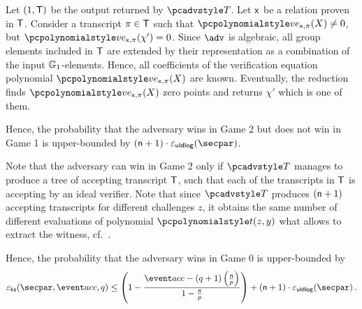   Let $(1, \mathsf{T})$ be the output returned by $\tdv$. Let $\mathsf{x}$ be a relation proven in $\mathsf{T}$.  Consider a transcript $\pi \in \mathsf{T}$ such that $\vereq_{\inp, \zkproof}(X) \neq 0$, but $\vereq_{\inp, \zkproof}(\chi') = 0$. Since $\adv$ is algebraic, all group elements included in $\mathsf{T}$ are extended by their representation as a combination of the input $\mathbb{G}_1$-elements. Hence, all coefficients of the verification equation polynomial $\vereq_{\inp, \zkproof}(X)$ are known. 
  Eventually, the reduction finds $\vereq_{\inp, \zkproof}(X)$ zero points and returns $\chi'$ which is one of them.
    
  Hence, the probability that the adversary wins in Game 2 but does not win in Game 1 is upper-bounded by $(\noofc + 1) \cdot \epsuldlog (\secpar)$.

  Note that the adversary can win in Game 2 only if $\tdv$ manages to produce a tree of accepting transcript $\mathsf{T}$, such that each of the transcripts in $\mathsf{T}$ is accepting by an ideal verifier. Note that since $\tdv$ produces $(\mathsf{n} + 1)$ accepting transcripts for different challenges $z$, it obtains the same number of different evaluations of polynomial $\p{t} (z, y)$ what allows to extract the witness, cf.~\cite{CCS:MBKM19}.

  Hence, the probability that the adversary wins in Game 0 is upper-bounded by 
  \[
    \epscss(\secpar,\accProb, q) \leq \left(1 - \frac{\accProb - (q + 1) \left( \frac{\noofc}{p} \right)}{1 - \frac{\noofc}{p}}\right) + (\noofc + 1) \cdot\epsuldlog (\secpar)\,. 
  \]

